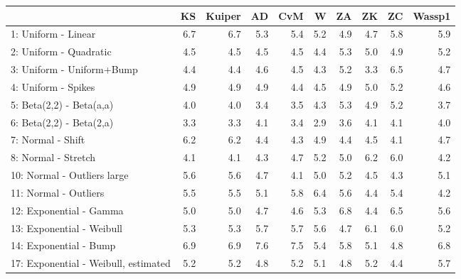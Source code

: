 \documentclass[
]{article}
\begin{document}
\begin{table}[H]
\centering\begingroup\fontsize{15}{17}\selectfont

\begin{tabular}{l|r|r|r|r|r|r|r|r|r}
\hline
  & KS & Kuiper & AD & CvM & W & ZA & ZK & ZC & Wassp1\\
\hline
1: Uniform - Linear & 6.7 & 6.7 & 5.3 & 5.4 & 5.2 & 4.9 & 4.7 & 5.8 & 5.9\\
\hline
2: Uniform - Quadratic & 4.5 & 4.5 & 4.5 & 4.5 & 4.4 & 5.3 & 5.0 & 4.9 & 5.2\\
\hline
3: Uniform - Uniform+Bump & 4.4 & 4.4 & 4.6 & 4.5 & 4.3 & 5.2 & 3.3 & 6.5 & 4.7\\
\hline
4: Uniform - Spikes & 4.9 & 4.9 & 4.9 & 4.4 & 4.5 & 4.9 & 5.0 & 5.2 & 4.6\\
\hline
5: Beta(2,2) - Beta(a,a) & 4.0 & 4.0 & 3.4 & 3.5 & 4.3 & 5.3 & 4.9 & 5.2 & 3.7\\
\hline
6: Beta(2,2) - Beta(2,a) & 3.3 & 3.3 & 4.1 & 3.4 & 2.9 & 3.6 & 4.1 & 4.1 & 4.0\\
\hline
7: Normal - Shift & 6.2 & 6.2 & 4.4 & 4.3 & 4.9 & 4.4 & 4.5 & 4.1 & 4.7\\
\hline
8: Normal  - Stretch & 4.1 & 4.1 & 4.3 & 4.7 & 5.2 & 5.0 & 6.2 & 6.0 & 4.2\\
\hline
10: Normal  - Outliers large & 5.6 & 5.6 & 4.7 & 4.1 & 5.0 & 5.2 & 4.5 & 4.3 & 5.1\\
\hline
11: Normal  - Outliers & 5.5 & 5.5 & 5.1 & 5.8 & 6.4 & 5.6 & 4.4 & 5.4 & 4.2\\
\hline
12: Exponential - Gamma & 5.0 & 5.0 & 4.7 & 4.6 & 5.3 & 6.8 & 4.4 & 6.5 & 5.6\\
\hline
13: Exponential - Weibull & 5.3 & 5.3 & 5.7 & 5.7 & 5.6 & 4.7 & 6.1 & 6.0 & 5.2\\
\hline
14: Exponential - Bump & 6.9 & 6.9 & 7.6 & 7.5 & 5.4 & 5.8 & 5.1 & 4.8 & 6.8\\
\hline
17: Exponential - Weibull, estimated & 5.2 & 5.2 & 4.8 & 5.2 & 5.1 & 4.8 & 5.2 & 4.4 & 5.7\\
\hline
\end{tabular}
\endgroup{}
\end{table}
\end{document}
